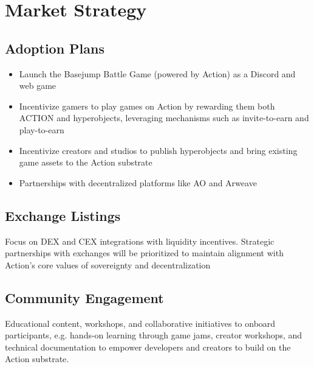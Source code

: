 \section{Market Strategy}

\subsection{Adoption Plans}
\begin{itemize}
\item Launch the Basejump Battle Game (powered by Action) as a Discord and web game
\item Incentivize gamers to play games on Action by rewarding them both ACTION and hyperobjects, leveraging mechanisms such as invite-to-earn and play-to-earn
\item Incentivize creators and studios to publish hyperobjects and bring existing game assets to the Action substrate
\item Partnerships with decentralized platforms like AO and Arweave
\end{itemize}

\subsection{Exchange Listings}
Focus on DEX and CEX integrations with liquidity incentives. Strategic partnerships with exchanges will be prioritized to maintain alignment with Action's core values of sovereignty and decentralization

\subsection{Community Engagement}
Educational content, workshops, and collaborative initiatives to onboard participants, e.g. hands-on learning through game jams, creator workshops, and technical documentation to empower developers and creators to build on the Action substrate. 